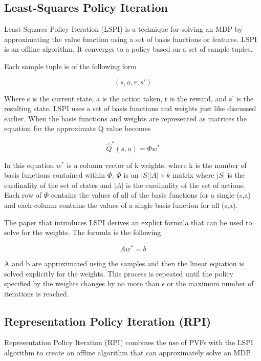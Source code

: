 \documentclass[12pt, letterpaper, final]{report}
\begin{document}
\subsection*{Least-Squares Policy Iteration}

Least-Squares Policy Iteration (LSPI) is a technique for solving an
MDP by approximating the value function using a set of basis functions
or features. \cite{lagoudakis_least-squares_2004} LSPI is an offline algorithm. It converges to a policy
based on a set of sample tuples.

Each sample tuple is of the following form

\[
(s, a, r, s')
\]

Where s is the current state, a is the action taken, r is the reward,
and s' is the resulting state. LSPI uses a set of basis functions and
weights just like discussed earlier. When the basis functions and
weights are represented as matrices the equation for the approximate Q
value becomes

\[
\hat{Q}^*(s,a) = \Phi w^*
\]

In this equation $w^*$ is a column vector of k weights, where k is the
number of basis functions contained within $\Phi$. $\Phi$ is an
$|S||A| \times k$ matrix where $|S|$ is the cardinality of the set of
states and $|A|$ is the cardinality of the set of actions. Each row of
$\Phi$ contains the values of all of the basis functions for a single
(s,a) and each column contains the values of a single basis function
for all (s,a). \cite{lagoudakis_least-squares_2004}

The paper that introduces LSPI derives an explict formula that can be
used to solve for the weights. \cite{lagoudakis_least-squares_2004} The formula is the
following

\[ Aw^* = b\]

A and b are approximated using the samples and then the linear
equation is solved explicitly for the weights. This process is
repeated until the policy specified by the weights changes by no more
than $\epsilon$ or the maximum number of iterations is reached.

\subsection*{Representation Policy Iteration (RPI)}

Representation Policy Iteration (RPI) combines the use of PVFs with
the LSPI algorithm to create an offline algorithm that can
approximately solve an MDP. \cite{sridhar_mahadevan_representation_????}
\end{document}
